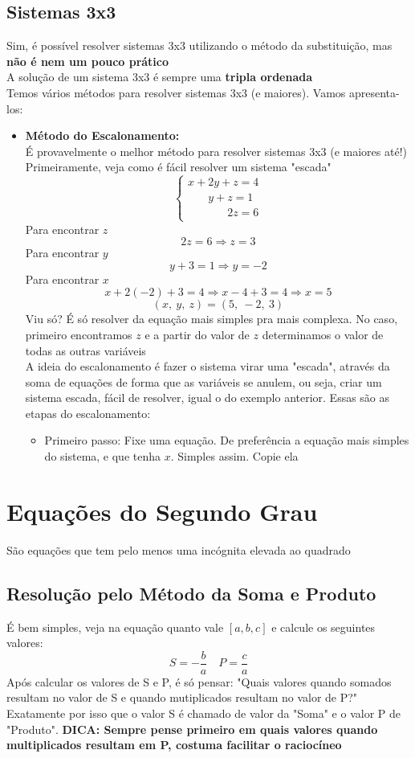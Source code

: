 \documentclass{article}
\begin{document}
\subsection{Sistemas 3x3}
Sim, é possível resolver sistemas 3x3 utilizando o método da substituição, mas \textbf{não é nem um pouco prático}
\\[5pt]
A solução de um sistema 3x3 é sempre uma \textbf{tripla ordenada}
\\[5pt]
Temos vários métodos para resolver sistemas 3x3 (e maiores). Vamos apresenta-los:
\begin{itemize}
    \item \textbf{Método do Escalonamento:}
    \\[5pt]
    É provavelmente o melhor método para resolver sistemas 3x3 (e maiores até!)
    \\[5pt]
    Primeiramente, veja como é fácil resolver um sistema "escada"
    \[
\begin{cases}
x + 2y + z = 4 \\
\phantom{x + {}} y + z = 1 \\
\phantom{x + {} y + {}} 2z = 6
\end{cases}
\]
Para encontrar $z$
\[
2z = 6 \Rightarrow z = 3
\]
Para encontrar $y$
\[
y + 3 = 1 \Rightarrow y = -2
\]
Para encontrar $x$
\[
x + 2(-2) + 3 = 4 \Rightarrow x - 4 + 3 = 4 \Rightarrow x = 5
\]
\[
(x,\ y,\ z) = (5,\ -2,\ 3)
\]
Viu só? É só resolver da equação mais simples pra mais complexa. No caso, primeiro encontramos $z$ e a partir do valor de $z$ determinamos o valor de todas as outras variáveis
\\[5pt]
A ideia do escalonamento é fazer o sistema virar uma "escada", através da soma de equações de forma que as variáveis se anulem, ou seja, criar um sistema escada, fácil de resolver, igual o do exemplo anterior. Essas são as etapas do escalonamento:
    \begin{itemize}
        \item Primeiro passo: Fixe uma equação. De preferência a equação mais simples do sistema, e que tenha $x$. Simples assim. Copie ela
    \end{itemize}
\end{itemize}

\section{Equações do Segundo Grau}
São equações que tem pelo menos uma incógnita elevada ao quadrado
\subsection{Resolução pelo Método da Soma e Produto}
É bem simples, veja na equação quanto vale $[a, b, c]$ e calcule os seguintes valores:
 \[
    S = -\frac{b}{a} \quad P = \frac{c}{a}
\]
Após calcular os valores de S e P, é só pensar: "Quais valores quando somados resultam no valor de S e quando mutiplicados resultam no valor de P?"
\\
Exatamente por isso que o valor S é chamado de valor da "Soma" e o valor P de "Produto". \textbf{DICA: Sempre pense primeiro em quais valores quando multiplicados resultam em P, costuma facilitar o raciocíneo}
\end{document}
